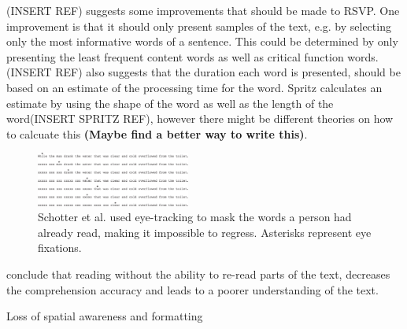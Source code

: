 (INSERT REF) suggests some improvements that should be made to RSVP. One improvement is that it should only present samples of the text, e.g. by selecting only the most informative words of a sentence. This could be determined by only presenting the least frequent content words as well as critical function words. (INSERT REF) also suggests that the duration each word is presented, should be based on an estimate of the processing time for the word. Spritz calculates an estimate by using the shape of the word as well as the length of the word(INSERT SPRITZ REF), however there might be different theories on how to calcuate this \textbf{(Maybe find a better way to write this)}.

\begin{figure}[htbp]
\centering
\includegraphics[width=0.45\textwidth]{Pics/trace_crosses}
\caption{Schotter et al. used eye-tracking to mask the words a person had already read, making it impossible to regress. Asterisks represent eye fixations.}
\label{fig:trace_cross}
\end{figure}

\citeauthor{schotter_dont_2014} conclude that reading without the ability to re-read parts of the text, decreases the comprehension accuracy and leads to a poorer understanding of the text.


Loss of spatial awareness and formatting

